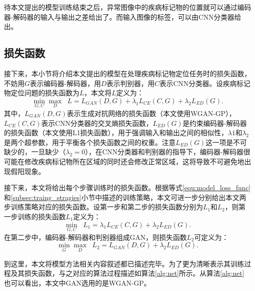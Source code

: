 待本文提出的模型训练结束之后，异常图像中的疾病标记物的位置就可以通过编码器-解码器的输入与输出之差给出了。而输入图像的标签，可以由CNN分类器给出。
\subsection{损失函数}\label{subsec:loss_func}
接下来，本小节将介绍本文提出的模型在处理疾病标记物定位任务时的损失函数，不妨用$G$表示编码器-解码器，用$D$表示判别器，用$C$表示CNN分类器。设疾病标记物定位问题的损失函数为${L}$，本文将$L$定义为：
\begin{equation}\label{equ:model_loss_func}
\min _{G, C} \max _{D} \;\; L=L_{GAN}(D, G)+\lambda_{1} L_{C E}(C, G)+\lambda_{2} L_{E D}(G).
\end{equation}
其中，$L_{GAN}(D,G)$表示生成对抗网络的损失函数（本文使用WGAN-GP），$L_{CE}(C, G)$表示CNN分类器的交叉熵损失函数，$L_{E D}(G)$是约束编码器-解码器的损失函数（本文使用L1损失函数），用于强调输入和输出之间的相似性，$\lambda{1}$和$\lambda_{2}$是两个超参数，用于平衡各个损失函数之间的权重。注意$L_{E D}(G)$这一项是不可缺少的，一旦缺少（$\lambda_{2}=0$），在CNN分类器和判别器的指导下，编码器-解码器很可能在修改疾病标记物所在区域的同时还会修改正常区域，这将导致不可避免地出现假阳现象。

接下来，本文将给出每个步骤训练时的损失函数。根据等式\ref{equ:model_loss_func}和\ref{subsec:traing_stragies}小节中描述的训练策略，本文可进一步分别给出本文两步训练策略对应的损失函数。设第一步和第二步的损失函数分别为$L_1$和$L_2$，则第一步训练的损失函数$L_1$定义为：
\begin{equation}
\min_{G, C} \;\; L_{1}=\lambda_1 L_{CE}(C,G) + \lambda_2 L_{ED}(G).
\end{equation}
在第二步中，编码器-解码器和判别器组成GAN，则损失函数$L_2$可定义为：
\begin{equation}
\min_{G} \max_D \;\; L_{2}= L_{GAN}(D,G) + \lambda_2 L_{ED}(G).
\end{equation}

到这里，本文将模型方法相关内容叙述都已描述完毕。为了更为清晰表示其训练过程及其损失函数，与之对应的算法过程描述如算法\ref{alg:net}所示。从算法\ref{alg:net}也可以看出，本文中GAN选用的是WGAN-GP。

